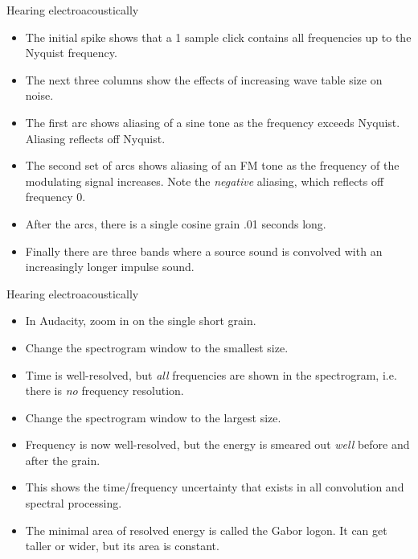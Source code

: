 \documentclass{beamer}
\begin{document}
\begin{frame}{Hearing electroacoustically}
\begin{itemize}
\item The initial spike shows that a 1 sample click contains all frequencies up to the Nyquist frequency.
\item The next three columns show the effects of increasing wave table size on noise.
\item The first arc shows aliasing of a sine tone as the frequency exceeds Nyquist. Aliasing reflects off Nyquist.
\item The second set of arcs shows aliasing of an FM tone as the frequency of the modulating signal increases. Note the \emph{negative} aliasing, which reflects off frequency 0.
\item After the arcs, there is a single cosine grain .01 seconds long.
\item Finally there are three bands where a source sound is convolved with an increasingly longer impulse sound.
\end{itemize}
\end{frame}

\begin{frame}{Hearing electroacoustically}
\begin{itemize}
\item In Audacity, zoom in on the single short grain.
\item Change the spectrogram window to the smallest size.
\item Time is well-resolved, but \emph{all} frequencies are shown in the spectrogram, i.e. there is \emph{no} frequency resolution.
\item Change the spectrogram window to the largest size.
\item Frequency is now well-resolved, but the energy is smeared out \emph{well} before and after the grain.
\item This shows the time/frequency uncertainty that exists in all convolution and spectral processing.
\item The minimal area of resolved energy is called the Gabor logon. It can get taller or wider, but its area is constant.
\end{itemize}
\end{frame}
\end{document}
